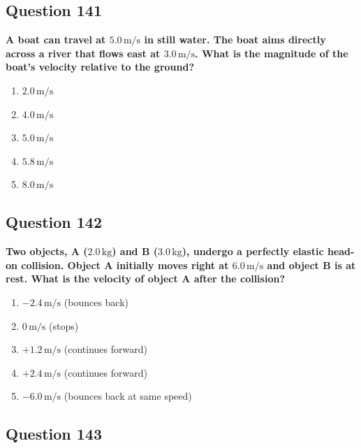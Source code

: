 \documentclass[12pt,letterpaper]{article}
\begin{document}
\subsection{Question 141}

\begin{questionbox}
\textbf{A boat can travel at $5.0\,\text{m/s}$ in still water. The boat aims directly across a river that flows east at $3.0\,\text{m/s}$. What is the magnitude of the boat's velocity relative to the ground?}

\begin{enumerate}[label=\alph*)]
    \item $2.0\,\text{m/s}$
    \item $4.0\,\text{m/s}$
    \item $5.0\,\text{m/s}$
    \item $5.8\,\text{m/s}$
    \item $8.0\,\text{m/s}$
\end{enumerate}
\end{questionbox}

\subsection{Question 142}

\begin{questionbox}
\textbf{Two objects, A ($2.0\,\text{kg}$) and B ($3.0\,\text{kg}$), undergo a perfectly elastic head-on collision. Object A initially moves right at $6.0\,\text{m/s}$ and object B is at rest. What is the velocity of object A after the collision?}

\begin{enumerate}[label=\alph*)]
    \item $-2.4\,\text{m/s}$ (bounces back)
    \item $0\,\text{m/s}$ (stops)
    \item $+1.2\,\text{m/s}$ (continues forward)
    \item $+2.4\,\text{m/s}$ (continues forward)
    \item $-6.0\,\text{m/s}$ (bounces back at same speed)
\end{enumerate}
\end{questionbox}

\subsection{Question 143}
\end{document}
